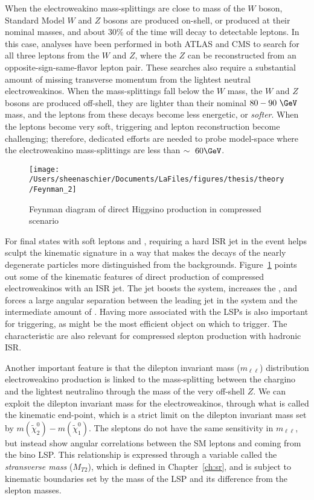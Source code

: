 When the electroweakino mass-splittings are close to mass of the $W$ boson, Standard Model $W$ and $Z$ bosons are produced on-shell, or produced at their nominal masses, and about $30\%$ of the time will decay to detectable leptons.  In this case, analyses have been performed in both ATLAS and CMS to search for all three leptons from the $W$ and $Z$, where the $Z$ can be reconstructed from an opposite-sign-same-flavor lepton pair.  These searches also require a substantial amount of missing transverse momentum from the lightest neutral electroweakinos.  When the mass-splittings fall below the $W$ mass, the $W$ and $Z$ bosons are produced off-shell, they are lighter than their nominal $80-90~\GeV$ mass, and the leptons from these decays become less energetic, or \textit{softer}.  When the leptons become very soft, triggering and lepton reconstruction become challenging; therefore, dedicated efforts are needed to probe model-space where the electroweakino mass-splittings are less than $\sim~60\GeV$. 
   \begin{figure}%
  \begin{center}
  \texttt{[image: /Users/sheenaschier/Documents/LaFiles/figures/thesis/theory/Feynman\_2]}
   \end{center}
 \caption{Feynman diagram of direct Higgsino production in compressed scenario}
 \label{fig:fn3}
 \end{figure}
For final states with soft leptons and \met{}, requiring a hard ISR jet in the event helps sculpt the kinematic signature in a way that makes the decays of the nearly degenerate particles more distinguished from the backgrounds.  Figure~\ref{fig:fn3} points out some of the kinematic features of direct production of compressed electroweakinos with an ISR jet.   The jet boosts the system, increases the \met, and forces a large angular separation between the leading jet in the system and the intermediate amount of \met.  Having more \met associated with the LSPs is also important for triggering, as \met might be the most efficient object on which to trigger.  The characteristic are also relevant for compressed slepton production with hadronic ISR.  

Another important feature is that the dilepton invariant mass ($m_{\ell\ell}$) distribution electroweakino production is linked to the mass-splitting between the chargino and the lightest neutralino through the mass of the very off-shell $Z$.  We can exploit the dilepton invariant mass for the electroweakinos, through what is called the kinematic end-point, which is a strict limit on the dilepton invariant mass set by $m(\tilde\chi_2^0)-m(\tilde\chi_1^0)$. The sleptons do not have the same sensitivity in $m_{\ell\ell}$, but instead show angular correlations between the SM leptons and \met{} coming from the bino LSP.  This relationship is expressed through a variable called the \textit{stransverse mass} ($M_{T2}$), which is defined in Chapter~\ref{ch:sr}, and is subject to kinematic boundaries set by the mass of the LSP and its difference from the slepton masses.

